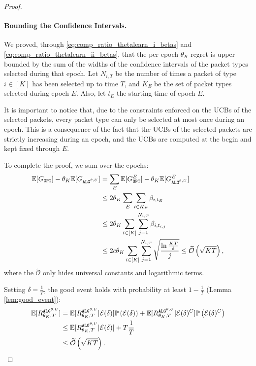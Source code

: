 \begin{proof}
    \paragraph{Bounding the Confidence Intervals.} We proved, through \eqref{eq:comp_ratio_thetalearn_i_betas} and \eqref{eq:comp_ratio_thetalearn_ii_betas}, that the per-epoch $\theta_K$-regret is upper bounded by the sum of the widths of the confidence intervals of the packet types selected during that epoch. Let $N_{i,T}$ be the number of times a packet of type $i\in [K]$ has been selected up to time $T$, and $K_E$ be the set of packet types selected during epoch $E$. Also, let $t_E$ the starting time of epoch $E$.
    
    It is important to notice that, due to the constraints enforced on the UCBs of the selected packets, every packet type can only be selected at most once during an epoch. This is a consequence of the fact that the UCBs of the selected packets are strictly increasing during an epoch, and the UCBs are computed at the begin and kept fixed through $E$. 
    
    To complete the proof, we sum over the epochs:
    \begin{align*}
        \mathbb{E}[\Gopt]-\theta_K\mathbb{E}[\Galgthetalearn] &= \sum_{E}\mathbb{E}[\Gopt^E]-\theta_K\mathbb{E}[\Galgthetalearn^E] \\
        &\le 2\theta_K\sum_{E} \sum_{i \in K_E} 
        \beta_{i,t_E} \\
        &\le 2\theta_K \sum_{i \in [K]} \sum_{j=1}^{N_{i,T}}\beta_{i,t_{i,j}} \\
        &\le  2c\theta_K \sum_{i \in [K]} \sum_{j=1}^{N_{i,T}}\sqrt{\frac{\ln \frac{KT}{\delta}}{j}} \le \widetilde{\mathcal{O}}\left(\sqrt{KT}\right),
    \end{align*}
    where the $\widetilde{\mathcal{O}}$ only hides universal constants and logarithmic terms.

    Setting $\delta=\frac{1}{T}$, the good event holds with probability at least $1-\frac{1}{T}$ (Lemma \ref{lem:good_event}):
    \begin{align*}
        \mathbb{E}[R_{\theta_K,T}^{\text{\algthetalearn}}] &= \mathbb{E}[R_{\theta_K,T}^{\text{\algthetalearn}}|\mathcal{E}(\delta)]\mathbb{P}\left(\mathcal{E}(\delta)\right) + \mathbb{E}[R_{\theta_K,T}^{\text{\algthetalearn}}|\mathcal{E}(\delta)^C]\mathbb{P}\left(\mathcal{E}(\delta)^C\right) \\
        &\le \mathbb{E}[R_{\theta_K,T}^{\text{\algthetalearn}}|\mathcal{E}(\delta)] + T\frac{1}{T} \\
        &\le \widetilde{\mathcal{O}}\left(\sqrt{KT}\right).
    \end{align*}
\end{proof}
